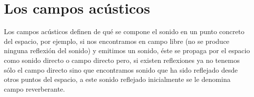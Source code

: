   
\section{Los campos acústicos}
  
Los campos acústicos definen de qué se compone el sonido en un punto concreto del espacio, por ejemplo, si nos encontramos en campo libre (no se produce ninguna reflexión del sonido) y emitimos un sonido, éste se propaga por el espacio como sonido directo o campo directo pero, si existen reflexiones ya no tenemos sólo el campo directo sino que encontramos sonido que ha sido reflejado desde otros puntos del espacio, a este sonido reflejado inicialmente se le denomina campo reverberante. 
 
 

























